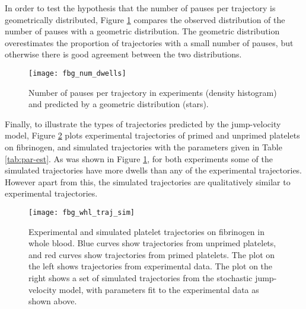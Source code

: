 \documentclass{biophys-new}
\begin{document}
In order to test the hypothesis that the number of pauses per
trajectory is geometrically distributed, Figure \ref{fig:ndwells}
compares the observed distribution of the number of pauses with a
geometric distribution. The geometric distribution overestimates the
proportion of trajectories with a small number of pauses, but
otherwise there is good agreement between the two distributions.

\begin{figure}
  \centering
  \texttt{[image: fbg\_num\_dwells]}
  \caption[Fit to pause counts per trajectory]{Number of pauses per
    trajectory in experiments (density histogram) and predicted by a
    geometric distribution (stars).}
  \label{fig:ndwells}
\end{figure}

Finally, to illustrate the types of trajectories predicted by the
jump-velocity model, Figure \ref{fig:fbg-whl-traj-sim} plots
experimental trajectories of primed and unprimed platelets on
fibrinogen, and simulated trajectories with the parameters given in
Table \ref{tab:par-est}. As was shown in Figure \ref{fig:ndwells}, for
both experiments some of the simulated trajectories have more dwells
than any of the experimental trajectories. However apart from this,
the simulated trajectories are qualitatively similar to experimental
trajectories. 

\begin{figure}
  \centering
  \texttt{[image: fbg\_whl\_traj\_sim]}
  \caption[Platelet trajectories on fibrinogen]{Experimental and
    simulated platelet trajectories on fibrinogen in whole blood. Blue
    curves show trajectories from unprimed platelets, and red curves
    show trajectories from primed platelets. The plot on the left
    shows trajectories from experimental data. The plot on the right
    shows a set of simulated trajectories from the stochastic
    jump-velocity model, with parameters fit to the experimental data
    as shown above.}
  \label{fig:fbg-whl-traj-sim}
\end{figure}

\end{document}
